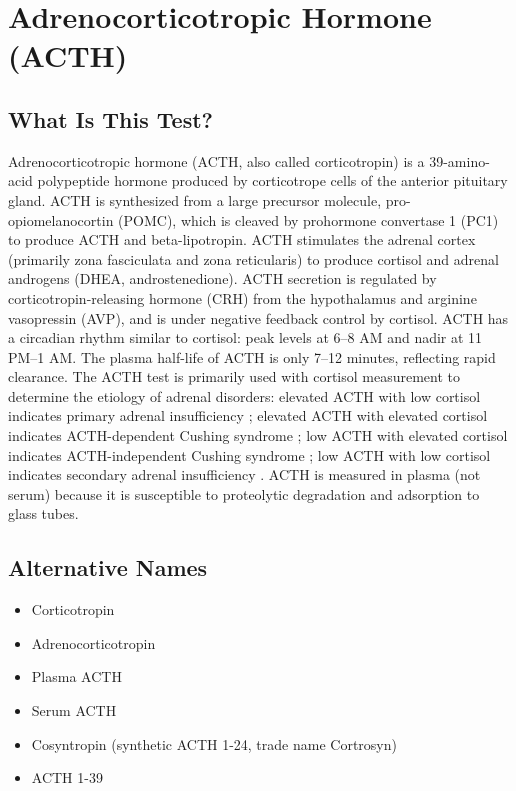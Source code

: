 \chapter{Adrenocorticotropic Hormone (ACTH)}

\section*{What Is This Test?}
Adrenocorticotropic hormone (ACTH, also called corticotropin) is a 39-amino-acid polypeptide hormone produced by corticotrope cells of the anterior pituitary gland. ACTH is synthesized from a large precursor molecule, pro-opiomelanocortin (POMC), which is cleaved by prohormone convertase 1 (PC1) to produce ACTH and beta-lipotropin. ACTH stimulates the adrenal cortex (primarily zona fasciculata and zona reticularis) to produce cortisol and adrenal androgens (DHEA, androstenedione). ACTH secretion is regulated by corticotropin-releasing hormone (CRH) from the hypothalamus and arginine vasopressin (AVP), and is under negative feedback control by cortisol. ACTH has a circadian rhythm similar to cortisol: peak levels at 6--8 AM and nadir at 11 PM--1 AM. The plasma half-life of ACTH is only 7--12 minutes, reflecting rapid clearance. The ACTH test is primarily used with cortisol measurement to determine the etiology of adrenal disorders: elevated ACTH with low cortisol indicates primary adrenal insufficiency \cite{bornstein2016diagnosis}; elevated ACTH with elevated cortisol indicates ACTH-dependent Cushing syndrome \cite{lacroix2015cushing}; low ACTH with elevated cortisol indicates ACTH-independent Cushing syndrome \cite{lacroix2015cushing}; low ACTH with low cortisol indicates secondary adrenal insufficiency \cite{bancos2015diagnosis}. ACTH is measured in plasma (not serum) because it is susceptible to proteolytic degradation and adsorption to glass tubes.

\section*{Alternative Names}
\begin{itemize}
  \item Corticotropin
  \item Adrenocorticotropin
  \item Plasma ACTH
  \item Serum ACTH
  \item Cosyntropin (synthetic ACTH 1-24, trade name Cortrosyn)
  \item ACTH 1-39
\end{itemize}
